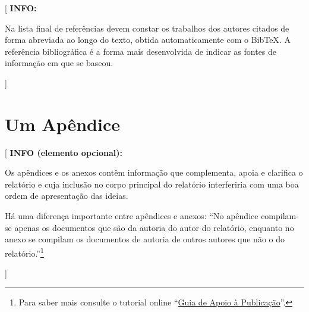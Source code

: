 \documentclass[11pt,a4paper]{report}
\newcommand{\class}[1]{{\normalfont\sffamily #1\/}}
\newenvironment{info}[1]{\vspace*{6mm}\color{blue}[ \textbf{INFO:} \begin{em} #1}
                        {\vspace*{3mm}\end{em} ]}
\newenvironment{infoopt}[1]{\vspace*{6mm}\color{blue}[ \textbf{INFO (elemento opcional):} \begin{em} #1}
                        {\vspace*{3mm}\end{em} ]}
\begin{document}

\renewcommand{\bibname}{Referências bibliográficas}
\printbibliography
{}  %

\begin{info}
Na lista final de referências devem constar os trabalhos dos autores
citados de forma abreviada ao longo do texto, obtida automaticamente
com o \class{BibTeX}.
A referência bibliográfica é a forma mais desenvolvida de indicar as
fontes de informação em que se baseou. 
\end{info}


\appendix
\chapter{Um Apêndice}

\begin{infoopt}
Os apêndices e os anexos contêm informação que complementa, apoia e
clarifica o relatório e cuja inclusão no corpo principal do relatório
interferiria com uma boa ordem de apresentação das ideias.

Há uma diferença importante entre apêndices e anexos: ``No apêndice
compilam-se apenas os documentos que são da autoria do autor do
relatório, enquanto no anexo se compilam os documentos de autoria de
outros autores que não o do relatório.''\footnote{%
Para saber mais consulte o tutorial online 
``\href{https://docs.google.com/document/d/1TDC1behVq8x7fQL4CcPEEh_np5GXviJevQxnQ9gbiJs/edit}
{Guia de Apoio à Publicação}''.}
\end{infoopt}

\end{document}

